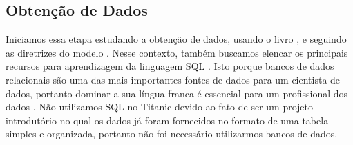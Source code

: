 \documentclass{article}
\begin{document}
\subsection{Obtenção de Dados}
Iniciamos essa etapa estudando a obtenção de dados, usando o livro \cite{DATAPYTHON}, e seguindo as diretrizes do modelo \cite{BATON}.  Nesse contexto, também buscamos elencar os principais recursos para aprendizagem da linguagem SQL \cite{chamberlin1974sequel}. Isto porque bancos de dados relacionais são uma das mais importantes fontes de dados para um cientista de dados, portanto dominar a sua língua franca é essencial para um profissional dos dados \cite{SCRATCH,DATAPYTHON}. Não utilizamos SQL no Titanic devido ao fato de ser um projeto introdutório no qual os dados já foram fornecidos no formato de uma tabela simples e organizada, portanto não foi necessário utilizarmos bancos de dados. 
\end{document}
